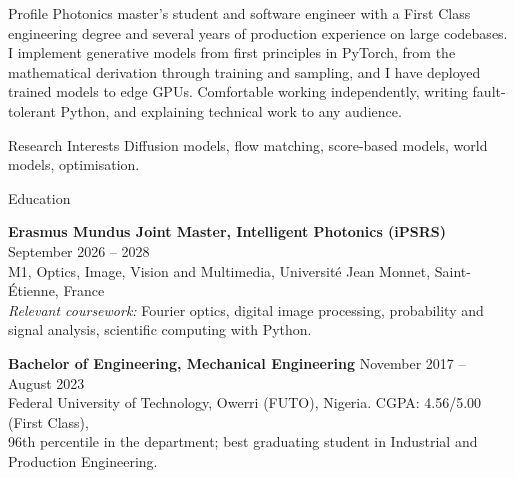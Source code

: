 \documentclass{resume}
\begin{document}
\begin{rSection}{Profile}
Photonics master's student and software engineer with a First Class engineering degree and several
years of production experience on large codebases. I implement generative models from first
principles in PyTorch, from the mathematical derivation through training and sampling, and I have
deployed trained models to edge GPUs. Comfortable working
independently, writing fault-tolerant Python, and explaining technical work to any audience.
\end{rSection}

\begin{rSection}{Research Interests}
Diffusion models, flow matching, score-based models, world models, optimisation.
\end{rSection}

\begin{rSection}{Education}

{\bf Erasmus Mundus Joint Master, Intelligent Photonics (iPSRS)} \hfill {September 2026 -- 2028}\\
M1, Optics, Image, Vision and Multimedia, Université Jean Monnet, Saint-Étienne, France\\
\textit{Relevant coursework:} Fourier optics, digital image processing, probability and signal analysis, scientific computing with Python.

{\bf Bachelor of Engineering, Mechanical Engineering} \hfill {November 2017 -- August 2023}\\
Federal University of Technology, Owerri (FUTO), Nigeria. CGPA: 4.56/5.00 (First Class),\\
96th percentile in the department; best graduating student in Industrial and Production Engineering.

\end{rSection}
\end{document}
